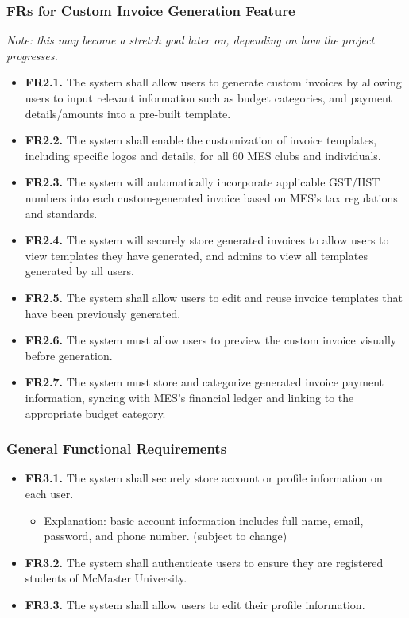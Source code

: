 \documentclass[12pt]{article}
\begin{document}
\subsubsection{FRs for Custom Invoice Generation Feature}
\textit{Note: this may become a stretch goal later on, depending on how the project progresses.}
\begin{itemize}
    \item \textbf{FR2.1.} The system shall allow users to generate custom invoices by allowing users to input relevant information such as budget categories, and payment details/amounts into a pre-built template.
    \item \textbf{FR2.2.} The system shall enable the customization of invoice templates, including specific logos and details, for all 60 MES clubs and individuals.
    \item \textbf{FR2.3.} The system will automatically incorporate applicable GST/HST numbers into each custom-generated invoice based on MES's tax regulations and standards.
    \item \textbf{FR2.4.} The system will securely store generated invoices to allow users to view templates they have generated, and admins to view all templates generated by all users.
    \item \textbf{FR2.5.} The system shall allow users to edit and reuse invoice templates that have been previously generated.
    \item \textbf{FR2.6.} The system must allow users to preview the custom invoice visually before generation.
    \item \textbf{FR2.7.} The system must store and categorize generated invoice payment information, syncing with MES's financial ledger and linking to the appropriate budget category.
\end{itemize}

\subsubsection{General Functional Requirements}
\begin{itemize}
    \item \textbf{FR3.1.} The system shall securely store account or profile information on each user.
    \begin{itemize}
        \item Explanation: basic account information includes full name, email, password, and phone number. (subject to change)
    \end{itemize}
    \item \textbf{FR3.2.} The system shall authenticate users to ensure they are registered students of McMaster University.
    \item \textbf{FR3.3.} The system shall allow users to edit their profile information.
\end{itemize}
    
\end{document}
